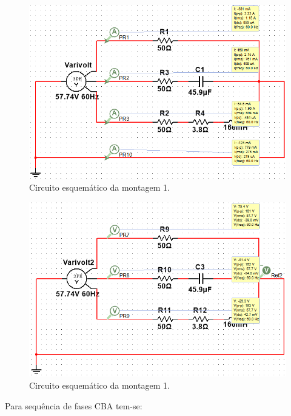 \documentclass[a4paper,12pt,oneside,openany,table,xcdraw]{article}
\begin{document}
\begin{figure}[H]
\centering
\includegraphics[width=13.5cm]{m1-esquema-abc-correntes}
\caption{Circuito esquemático da montagem 1.}
\label{m1:IL}
\end{figure}
\begin{figure}[H]
\centering
\includegraphics[width=13.5cm]{m1-esquema-abc-vf}
\caption{Circuito esquemático da montagem 1.}
\label{m1:VF}
\end{figure}

Para sequência de fases CBA tem-se: 
\end{document}
